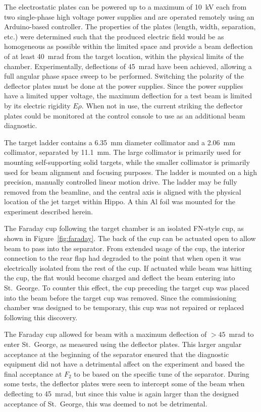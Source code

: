 The electrostatic plates can be powered up to a maximum of 10~kV each from two
single-phase high voltage power supplies and are operated remotely using an
Arduino-based controller. The properties of the plates (length, width,
separation, etc.) were determined such that the produced electric field would
be as homogeneous as possible within the limited space and provide a beam
deflection of at least 40~mrad from the target location, within the physical
limits of the chamber. Experimentally, deflections of 45~mrad have been
achieved, allowing a full angular phase space sweep to be performed. Switching
the polarity of the deflector plates must be done at the power supplies. Since
the power supplies have a limited upper voltage, the maximum deflection for a
test beam is limited by its electric rigidity $E\rho$. When not in use, the
current striking the deflector plates could be monitored at the control console
to use as an additional beam diagnostic.

The target ladder contains a 6.35~mm diameter collimator and a 2.06~mm
collimator, separated by 11.1~mm. The large collimator is primarily used for
mounting self-supporting solid targets, while the smaller collimator is
primarily used for beam alignment and focusing purposes. The ladder is mounted
on a high precision, manually controlled linear motion drive.
The ladder may be fully removed from the beamline, and the central axis is
aligned with the physical location of the jet target within Hippo. A thin Al
foil was mounted for the experiment described herein.

The Faraday cup following the target chamber is an isolated FN-style cup, as
shown in Figure~\ref{fig:faraday}. The back of the cup can be actuated open to allow beam to
pass into the separator. From extended usage of the cup, the interior
connection to the rear flap had degraded to the point that when open it was
electrically isolated from the rest of the cup. If actuated while beam was
hitting the cup, the flat would become charged and deflect the beam entering
into St.\ George. To counter this effect, the cup preceding the target cup was
placed into the beam before the target cup was removed. Since the commissioning
chamber was designed to be temporary, this cup was not repaired or replaced
following this discovery.

The Faraday cup allowed for beam with a maximum deflection of $>45$~mrad to
enter St.\ George, as measured using the deflector plates. This larger angular
acceptance at the beginning of the separator ensured that the diagnostic
equipment did not have a detrimental affect on the experiment and based the
final acceptance at $F_2$ to be based on the specific tune of the separator.
During some tests, the deflector plates were seen to intercept some of the beam
when deflecting to 45~mrad, but since this value is again larger than the
designed acceptance of St.\ George, this was deemed to not be detrimental.
